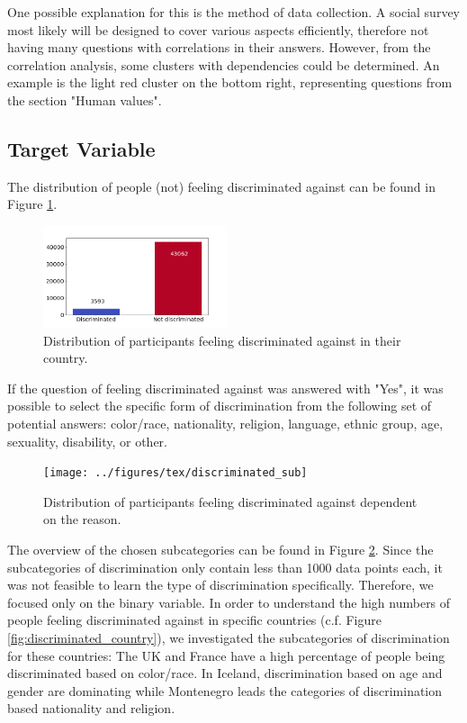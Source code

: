 \documentclass[10pt]{article}
\begin{document}
	One possible explanation for this is the method of data collection. A social survey most likely will be designed to cover various aspects efficiently, therefore not having many questions with correlations in their answers. 
	However, from the correlation analysis, some  clusters with dependencies could be determined. An example is the light red cluster on the bottom right, representing questions from the section "Human values". 
	
	
	\subsection{Target Variable} \label{sec:target_variable}
	The distribution of people (not) feeling discriminated against can be found in Figure \ref{fig:discriminated_dist}.
	\begin{figure}[h]
		\centering
		\includegraphics[width=0.48\textwidth]{../figures/tex/discriminated_small}
		\caption{Distribution of participants feeling discriminated against in their country.}
		\label{fig:discriminated_dist}
	\end{figure}
	
	If the question of feeling discriminated against was answered with "Yes", it was possible to select the specific form of discrimination from the following set of potential answers: color/race, nationality, religion, language, ethnic group, age, sexuality, disability, or other. 
	\begin{figure}[h]
		\centering
		\texttt{[image: ../figures/tex/discriminated\_sub]}
		\caption{Distribution of participants feeling discriminated against dependent on the reason.}
		\label{fig:discriminated_sub_dist}
	\end{figure}
	The overview of the chosen subcategories can be found in Figure \ref{fig:discriminated_sub_dist}. Since the subcategories of discrimination only contain less than 1000 data points each, it was not feasible to learn the type of discrimination specifically. Therefore, we focused only on the binary variable. 
	In order to understand the high numbers of people feeling discriminated against in specific countries (c.f. Figure \ref{fig:discriminated_country}), we investigated the subcategories of discrimination for these countries: The UK and France have a high percentage of people being discriminated based on color/race. In Iceland, discrimination based on age and gender are dominating while Montenegro leads the categories of discrimination based nationality and religion. 
	
\end{document}
